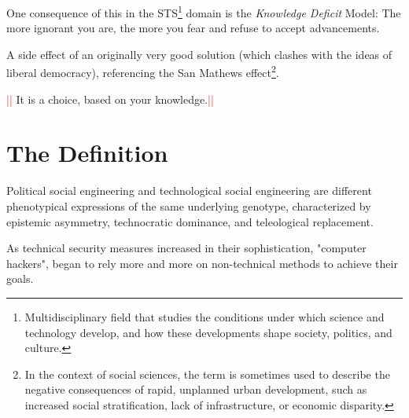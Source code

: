         \vspace{0.1cm}
    
        One consequence of this in the STS\footnote{Multidisciplinary field that studies the conditions under which science and technology develop, and how these developments shape society, politics, and culture.} domain is the \textit{Knowledge Deficit} Model: The more ignorant you are, the more you fear and refuse to accept advancements.
            
        \vspace{0.1cm}
    
        A side effect of an originally very good solution (which clashes with the ideas of liberal democracy), referencing the San Mathews effect\footnote{In the context of social sciences, the term is sometimes used to describe the negative consequences of rapid, unplanned urban development, such as increased social stratification, lack of infrastructure, or economic disparity.}.

        \vspace{0.1cm}
    
        \textcolor{Red}{||} It is a choice, based on your knowledge.\textcolor{Red}{||}
    
\section{The Definition}
Political social engineering and technological social engineering are different phenotypical expressions of the same underlying genotype, characterized by epistemic asymmetry, technocratic dominance, and teleological replacement.

As technical security measures increased in their sophistication, "computer hackers", began to rely more and more on non-technical methods to achieve their goals. 

